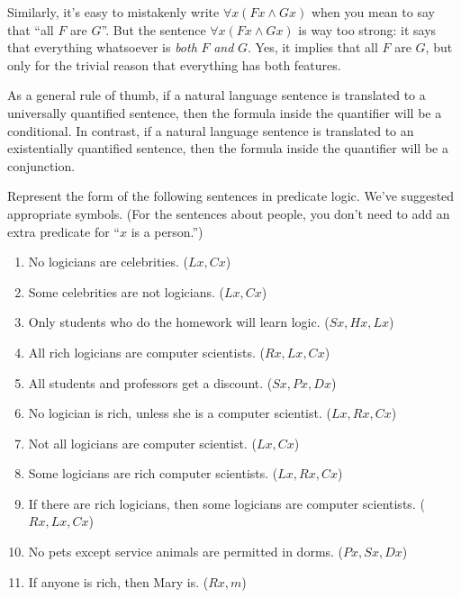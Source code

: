 Similarly, it's easy to mistakenly write $\forall x(Fx\wedge Gx)$ when
you mean to say that ``all $F$ are $G$''.  But the sentence
$\forall x(Fx\wedge Gx)$ is way too strong: it says that everything
whatsoever is {\it both} $F$ {\it and} $G$.  Yes, it implies that all
$F$ are $G$, but only for the trivial reason that everything has both
features.  

As a general rule of thumb, if a natural language sentence is
translated to a universally quantified sentence, then the formula
inside the quantifier will be a conditional.  In contrast, if a
natural language sentence is translated to an existentially quantified
sentence, then the formula inside the quantifier will be a
conjunction.


\begin{exercise} Represent the form of the following sentences in
  predicate logic.  We've suggested appropriate symbols.  (For the
  sentences about people, you don't need to add an extra predicate for
  ``$x$ is a person.'')
  \begin{enumerate}
  \item No logicians are celebrities.  ($Lx,Cx$)
  \item Some celebrities are not logicians. ($Lx,Cx$)
  \item Only students who do the homework will learn logic.
    ($Sx,Hx,Lx$)
  \item All rich logicians are computer scientists. ($Rx,Lx,Cx$)
  \item All students and professors get a discount. ($Sx,Px,Dx$)
  \item No logician is rich, unless she is a computer
    scientist. ($Lx,Rx,Cx$)
  \item Not all logicians are computer scientist.  ($Lx,Cx$)
  \item Some logicians are rich computer scientists.  ($Lx,Rx,Cx$)
  \item If there are rich logicians, then some logicians are computer
    scientists. ($Rx,Lx,Cx$)
  \item No pets except service animals are permitted in dorms. ($Px,Sx,Dx$)
  \item If anyone is rich, then Mary is.  ($Rx,m$)
  \end{enumerate}
\end{exercise}


